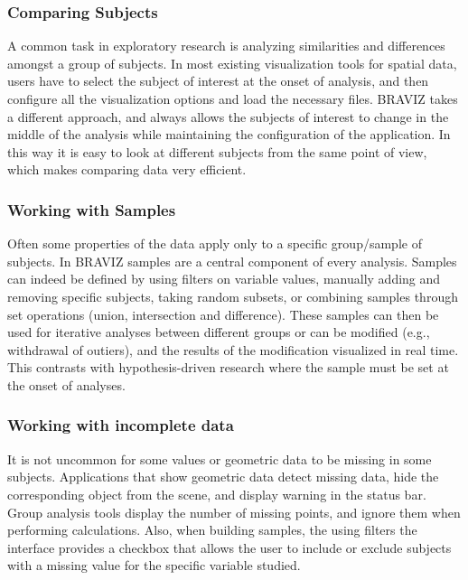 \documentclass{frontiersHLTH}
\begin{document}
\subsubsection{Comparing Subjects}

A common task in exploratory research is analyzing similarities and differences amongst a group of subjects. In most existing visualization tools for spatial data, users have to select the subject of interest at the onset of analysis, and then configure all the visualization options and load the necessary files. BRAVIZ takes a different approach, and always allows the subjects of interest to change in the middle of the analysis while maintaining the configuration of the application. In this way it is easy to look at different subjects from the same point of view, which makes comparing data very efficient.  

\subsubsection{Working with Samples}
\label{subsamples}
Often some properties of the data apply only to a specific group/sample of subjects. In BRAVIZ samples are a central component of every analysis. Samples can indeed be defined by using filters on variable values, manually adding and removing specific subjects, taking random subsets, or combining samples through set operations (union, intersection and difference). 
These samples can then be used for iterative analyses between different groups or can be modified (e.g., withdrawal of outiers), and the results of the modification visualized in real time. This contrasts with hypothesis-driven research where the sample must be set at the onset of analyses.



\subsubsection{Working with incomplete data}

It is not uncommon for some values or geometric data to be missing in some subjects. Applications that show geometric data detect missing data, hide the corresponding object from the scene, and display warning in the status bar. Group analysis tools display the number of missing points, and ignore them when performing calculations. Also, when building samples, the using filters the interface provides a checkbox that allows the user to include or exclude subjects with a missing value for the specific variable studied.
\end{document}
